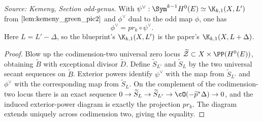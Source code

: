 \begin{lemma}
  \label{lem:kemeny_odd_projection_comparison}
  \textit{Source: Kemeny, Section odd-genus.}
  With \(\psi^\vee:\Sym^{k-1}H^0(E)\simeq\K_{k,1}(X,L')\) from
  \(\cref{lem:kemeny_green_pic2}\) and \(\phi^\vee\) dual to the odd map
  \(\phi\), one has
  \[
    \phi^\vee=pr_k\circ\psi^\vee .
  \]
  Here \(L=L'-\Delta\), so the blueprint's \(\K_{k,1}(X,L')\) is the paper's
  \(\K_{k,1}(X,L+\Delta)\).
\end{lemma}
\begin{proof}
  Blow up the codimension-two universal zero locus
  \(\widetilde{\mathcal Z}\subset X\times\PP(H^0(E))\), obtaining
  \(\widetilde B\) with exceptional divisor \(\widetilde D\).  Define
  \(\widetilde S_{L'}\) and \(\widetilde S_L\) by the two universal secant
  sequences on \(\widetilde B\).  Exterior powers identify \(\psi^\vee\) with the
  map from \(\widetilde S_{L'}\) and \(\phi^\vee\) with the corresponding map
  from \(\widetilde S_L\).  On the complement of the codimension-two locus there
  is an exact sequence
  \(0\to\widetilde S_L\to\widetilde S_{L'}\to\cO(-\widetilde p^*\Delta)\to0\),
  and the induced exterior-power diagram is exactly the projection \(pr_k\).  The
  diagram extends uniquely across codimension two, giving the equality.
\end{proof}


